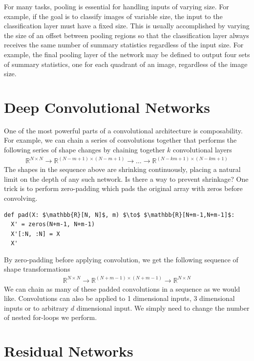 \documentclass[book.tex]{subfiles}
\begin{document}
For many tasks, pooling is essential for handling inputs of varying size. For example, if the goal is to classify images of variable size, the input to the classification layer must have a fixed size. This is usually accomplished by varying the size of an offset between pooling regions so that the classification layer always receives the same number of summary statistics regardless of the input size. For example, the final pooling layer of the network may be defined to output four sets of summary statistics, one for each quadrant of an image, regardless of the image size. 

\section{Deep Convolutional Networks}

One of the most powerful parts of a convolutional architecture is composability. For example, we can chain a series of convolutions together that performs the following series of shape changes by chaining together $k$ convolutional layers
\begin{align}
\mathbb{R}^{N \times N} \to \mathbb{R}^{(N-m+1)\times(N-m+1)}  \to \dotsc \to \mathbb{R}^{(N-km+1)\times(N-km+1)}
\end{align}
The shapes in the sequence above are shrinking continuously, placing a natural limit on the depth of any such network. Is there a way to prevent shrinkage? One trick is to perform zero-padding which pads the original array with zeros before convolving.
\begin{lstlisting}
def pad(X: $\mathbb{R}[N, N]$, m) $\to$ $\mathbb{R}[N+m-1,N+m-1]$:
  X' = zeros(N+m-1, N+m-1)
  X'[:N, :N] = X
  X'
\end{lstlisting}
By zero-padding before applying convolution, we get the following sequence of shape transformations
\begin{align}
\mathbb{R}^{N \times N} \to \mathbb{R}^{(N+m-1)\times(N+m-1)} \to
\mathbb{R}^{N \times N}
\end{align}
We can chain as many of these padded convolutions in a sequence as we would like. Convolutions can also be applied to 1 dimensional inputs, 3 dimensional inputs or to arbitrary $d$ dimensional input. We simply need to change the number of nested for-loops we perform.

\section{Residual Networks}
\end{document}
